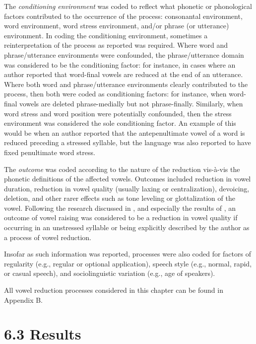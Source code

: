   The \textit{conditioning} \textit{environment} was coded to reflect what phonetic or phonological factors contributed to the occurrence of the process: consonantal environment, word environment, word stress environment, and/or phrase (or utterance) environment. In coding the conditioning environment, sometimes a reinterpretation of the process as reported was required. Where word and phrase/utterance environments were confounded, the phrase/utterance domain was considered to be the conditioning factor: for instance, in cases where an author reported that word-final vowels are reduced at the end of an utterance. Where both word and phrase/utterance environments clearly contributed to the process, then both were coded as conditioning factors: for instance, when word-final vowels are deleted phrase-medially but not phrase-finally. Similarly, when word stress and word position were potentially confounded, then the stress environment was considered the sole conditioning factor. An example of this would be when an author reported that the antepenultimate vowel of a word is reduced preceding a stressed syllable, but the language was also reported to have fixed penultimate word stress.



  The \textit{outcome} was coded according to the nature of the reduction vis-à{}-vis the phonetic definitions of the affected vowels. Outcomes included reduction in vowel duration, reduction in vowel quality (usually laxing or centralization), devoicing, deletion, and other rarer effects such as tone leveling or glottalization of the vowel. Following the research discussed in , and especially the results of \citet{KapatsinskiEtAl2019}, an outcome of vowel raising was considered to be a reduction in vowel quality if occurring in an unstressed syllable or being explicitly described by the author as a process of vowel reduction.



  Insofar as such information was reported, processes were also coded for factors of regularity (e.g., regular or optional application), speech style (e.g., normal, rapid, or casual speech), and sociolinguistic variation (e.g., age of speakers).



  All vowel reduction processes considered in this chapter can be found in Appendix B.


\section{6.3  Results}

